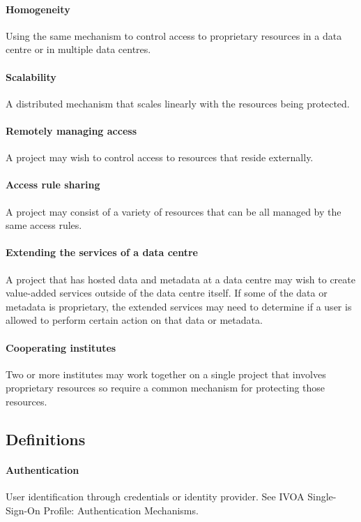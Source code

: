 \documentclass[11pt,a4paper]{ivoa}
\begin{document}
\paragraph{Homogeneity} Using the same mechanism to control access to proprietary resources in a data centre or in multiple data centres.

\paragraph{Scalability} A distributed mechanism that scales linearly with the resources being protected.

\paragraph{Remotely managing access} A project may wish to control access to resources that reside externally.

\paragraph{Access rule sharing} A project may consist of a variety of resources that can be all managed by the same access rules.

\paragraph{Extending the services of a data centre} A project that has hosted data and metadata at a data centre may wish to create value-added services outside of the data centre itself.  If some of the data or metadata is proprietary, the extended services may need to determine if a user is allowed to perform certain action on that data or metadata.

\paragraph{Cooperating institutes} Two or more institutes may work together on a single project that involves proprietary resources so require a common mechanism for protecting those resources.

\subsection{Definitions}

\paragraph{Authentication} User identification through credentials or identity provider.  See IVOA Single-Sign-On Profile: Authentication Mechanisms.  \citep{2017ivoa.spec.0524T}
\end{document}
